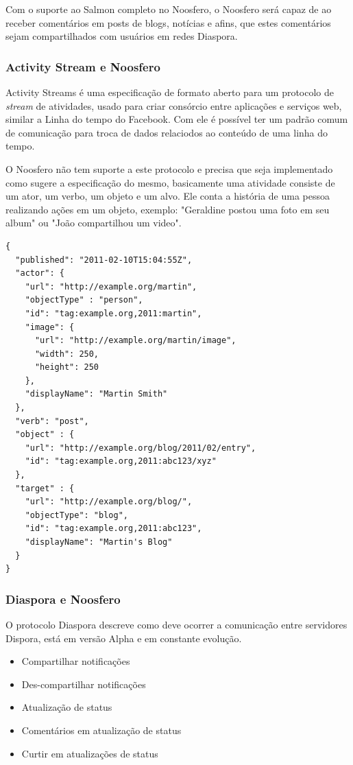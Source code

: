 \documentclass[12pt]{article}
\begin{document}
Com o suporte ao Salmon completo no Noosfero, o Noosfero será capaz de ao
receber comentários em posts de blogs, notícias e afins, que estes comentários
sejam compartilhados com usuários em redes Diaspora.

\subsubsection{Activity Stream e Noosfero}

Activity Streams é uma especificação de formato aberto para um protocolo de
{\it stream} de atividades, usado para criar consórcio entre aplicações e
serviços web, similar a Linha do tempo do Facebook. Com ele é possível ter um
padrão comum de comunicação para troca de dados relaciodos ao conteúdo de uma
linha do tempo.

O Noosfero não tem suporte a este protocolo e precisa que seja implementado
como sugere a especificação do mesmo, basicamente uma atividade consiste de um
ator, um verbo, um objeto e um alvo. Ele conta a história de uma pessoa
realizando ações em um objeto, exemplo: "Geraldine postou uma foto em seu
album" ou "João compartilhou um video"\cite{streams}.

\begin{framed}
\begin{lstlisting}[caption=Exemplo simples de atividade JSON serializada]
{
  "published": "2011-02-10T15:04:55Z",
  "actor": {
    "url": "http://example.org/martin",
    "objectType" : "person",
    "id": "tag:example.org,2011:martin",
    "image": {
      "url": "http://example.org/martin/image",
      "width": 250,
      "height": 250
    },
    "displayName": "Martin Smith"
  },
  "verb": "post",
  "object" : {
    "url": "http://example.org/blog/2011/02/entry",
    "id": "tag:example.org,2011:abc123/xyz"
  },
  "target" : {
    "url": "http://example.org/blog/",
    "objectType": "blog",
    "id": "tag:example.org,2011:abc123",
    "displayName": "Martin's Blog"
  }
}
\end{lstlisting}
\end{framed}

\subsubsection{Diaspora e Noosfero}

O protocolo Diaspora descreve como deve ocorrer a comunicação entre servidores
Dispora, está em versão Alpha e em constante evolução.

\begin{itemize}
  \item Compartilhar notificações
  \item Des-compartilhar notificações
  \item Atualização de status
  \item Comentários em atualização de status
  \item Curtir em atualizações de status
\end{itemize}
\end{document}
